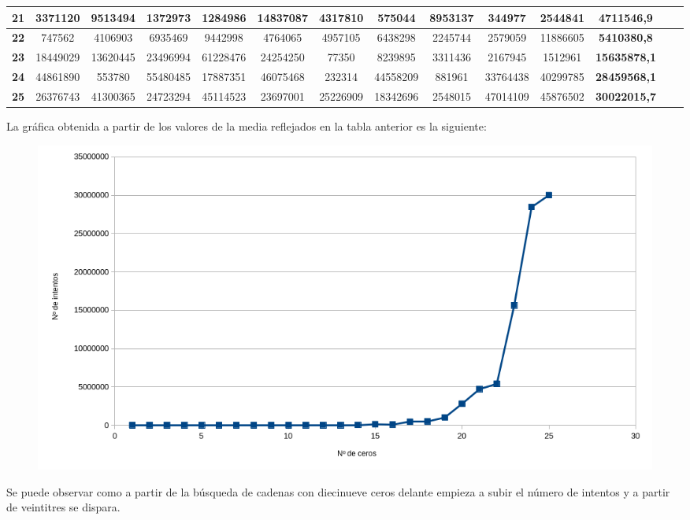 \documentclass[10pt,a4paper,spanish]{report}
\begin{document}
\begin{table}[h!]
\begin{adjustbox}{max width=\textwidth}
\begin{tabular}{*{14}{|c}|}
   \textbf{21}                    & 3371120    & 9513494    & 1372973    & 1284986    & 14837087   & 4317810    & 575044     & 8953137    & 344977     & 2544841     & \textbf{4711546,9}  \\ \hline
   \textbf{22}                    & 747562     & 4106903    & 6935469    & 9442998    & 4764065    & 4957105    & 6438298    & 2245744    & 2579059    & 11886605    & \textbf{5410380,8}  \\ \hline
   \textbf{23}                    & 18449029   & 13620445   & 23496994   & 61228476   & 24254250   & 77350      & 8239895    & 3311436    & 2167945    & 1512961     & \textbf{15635878,1} \\ \hline
   \textbf{24}                    & 44861890   & 553780     & 55480485   & 17887351   & 46075468   & 232314     & 44558209   & 881961     & 33764438   & 40299785    & \textbf{28459568,1} \\ \hline
   \textbf{25}                    & 26376743   & 41300365   & 24723294   & 45114523   & 23697001   & 25226909   & 18342696   & 2548015    & 47014109   & 45876502    & \textbf{30022015,7} \\ \hline
  \end{tabular}
 \end{adjustbox}
\end{table}

\noindent
La gráfica obtenida a partir de los valores de la media reflejados en la tabla anterior es la siguiente:

\begin{figure}[!hbp]
 \centering  \includegraphics[width=1\textwidth]{./Imagenes/grafica_1.png}
\end{figure}

\noindent
Se puede observar como a partir de la búsqueda de cadenas con diecinueve ceros delante empieza a subir el número de intentos y a partir de veintitres se dispara.
\end{document}
